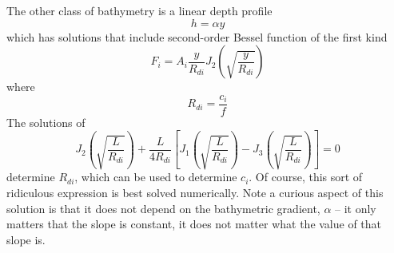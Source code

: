 \documentclass[11pt]{report}
\numberwithin{equation}{section}
\begin{document}
The other class of bathymetry is a linear depth profile
\begin{equation}
    h = \alpha y
\end{equation}
which has solutions that include second-order Bessel function of the first kind
\begin{equation}
    F_i = A_i \frac{y}{R_{di}} J_2 \left( \sqrt{\frac{y}{R_{di}}} \right)
\end{equation}
where 
\begin{equation}
    R_{di} = \frac{c_i}{f}
\end{equation}
The solutions of
\begin{equation}
    J_2 \left( \sqrt{\frac{L}{R_{di}}} \right) + \frac{L}{4 R_{di}}\left[ J_1\left( \sqrt{\frac{L}{R_{di}}} \right) - J_3\left( \sqrt{\frac{L}{R_{di}}} \right) \right] = 0
\end{equation}
determine $R_{di}$, which can be used to determine $c_i$.  Of course, this sort of ridiculous expression is best solved numerically.  Note a curious aspect of this solution is that it does not depend on the bathymetric gradient, $\alpha$ -- it only matters that the slope is constant, it does not matter what the value of that slope is.
\end{document}
